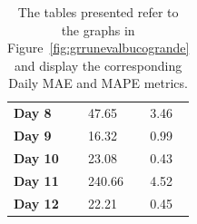 \begin{table}[H]
\begin{minipage}[t]{.45\textwidth}
\begin{center}
\begin{tabular}[c]{l|l|l}
				\textbf{Day 8}  & 47.65                                  & 3.46 \\
				\textbf{Day 9}  & 16.32                                  & 0.99 \\
				\textbf{Day 10} & 23.08                                  & 0.43 \\
				\textbf{Day 11} & 240.66                                 & 4.52 \\
				\textbf{Day 12} & 22.21                                  & 0.45
			\end{tabular}
		\end{center}
	\end{minipage}
	\caption{The tables presented refer to the graphs in Figure~\ref{fig:grrunevalbucogrande} and display the corresponding Daily MAE and MAPE metrics.}
\end{table}